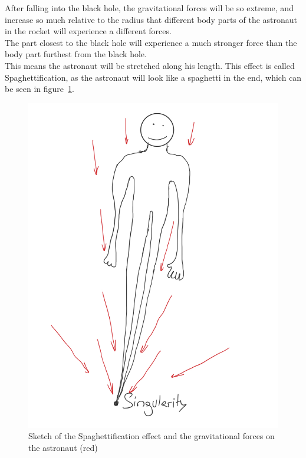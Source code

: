 \documentclass[reprint,english,notitlepage]{revtex4-2}
\begin{document}
        After falling into the black hole, the gravitational forces will be so extreme, and increase so much relative to the radius that different body parts of the astronaut in the rocket will experience a different forces.\\
        The part closest to the black hole will experience a much stronger force than the body part furthest from the black hole.\\
        This means the astronaut will be stretched along his length.
        This effect is called Spaghettification, as the astronaut will look like a spaghetti in the end, which can be seen in figure~\ref{fig:spaghettification}.

        \begin{figure}[h]
            \centering
            \includegraphics[scale=0.15]{spaghettification}
            \caption{Sketch of the Spaghettification effect and the gravitational forces on the astronaut (red)}\label{fig:spaghettification}
        \end{figure}
\end{document}
